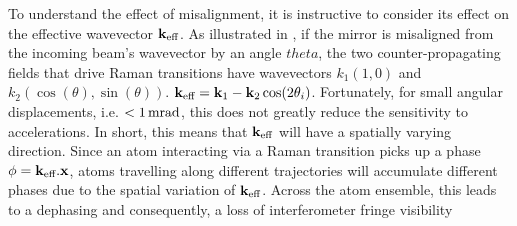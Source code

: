 \par\noindent
To understand the effect of misalignment, it is instructive to consider its effect on the effective wavevector \({\textbf k_\textnormal{eff}}\). As illustrated in , if the mirror is misaligned from the incoming beam's wavevector by an angle \(theta\), the two counter-propagating fields that drive Raman transitions have wavevectors \(k_1 \left(1,0\right)\) and \(k_2 \left(\cos(\theta),\sin(\theta)\right)\). \({\textbf k_\textnormal{eff}} = {\textbf k_1} - {\textbf k_2} \cos (2\theta_i)\).  Fortunately, for small angular displacements, i.e. \(< \sivalue{1}{\milli\radian}\), this does not greatly reduce the sensitivity to accelerations. In short, this means that \({\textbf k_\textnormal{eff}}\) will have a spatially varying direction. Since an atom interacting via a Raman transition picks up a phase \(\phi = {\textbf k_\textnormal{eff}} . {\textbf x}\), atoms travelling along different trajectories will accumulate different phases due to the spatial variation of \({\textbf k_\textnormal{eff}}{}\). Across the atom ensemble, this leads to a dephasing and consequently, a loss of interferometer fringe visibility~\cite{Tackmann2012}
